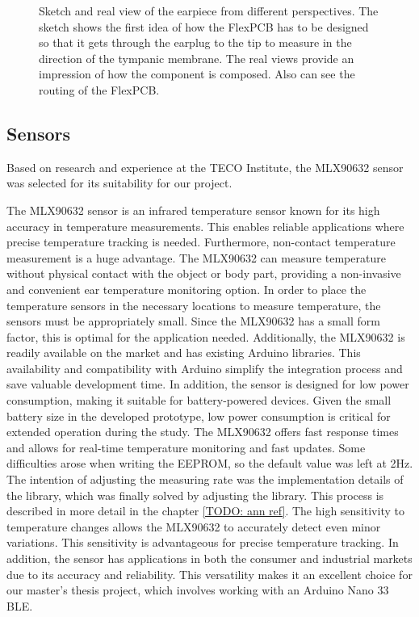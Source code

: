 \begin{figure}[!h]
    \caption{Sketch and real view of the earpiece from different perspectives.
The sketch shows the first idea of how the FlexPCB has to be designed so that it gets through the earplug to the tip to measure in the direction of the tympanic membrane. The real views provide an impression of how the component is composed. Also can see the routing of the FlexPCB.}
    \label{fig:design:prototype_earpiece_views}
\end{figure}

\subsection{Sensors}
\label{ch:Design:Prototype:Sensors}

Based on research and experience at the TECO Institute, the MLX90632 sensor was selected for its suitability for our project.

The MLX90632 sensor is an infrared temperature sensor known for its high accuracy in temperature measurements. This enables reliable applications where precise temperature tracking is needed.
Furthermore, non-contact temperature measurement is a huge advantage. The MLX90632 can measure temperature without physical contact with the object or body part, providing a non-invasive and convenient ear temperature monitoring option.
In order to place the temperature sensors in the necessary locations to measure temperature, the sensors must be appropriately small. Since the MLX90632 has a small form factor, this is optimal for the application needed.
Additionally, the MLX90632 is readily available on the market and has existing Arduino libraries. This availability and compatibility with Arduino simplify the integration process and save valuable development time.
In addition, the sensor is designed for low power consumption, making it suitable for battery-powered devices. Given the small battery size in the developed prototype, low power consumption is critical for extended operation during the study.
The MLX90632 offers fast response times and allows for real-time temperature monitoring and fast updates. Some difficulties arose when writing the EEPROM, so the default value was left at 2Hz.
The intention of adjusting the measuring rate was the implementation details of the library, which was finally solved by adjusting the library. This process is described in more detail in the chapter \ref{TODO: ann ref}.
The high sensitivity to temperature changes allows the MLX90632 to accurately detect even minor variations. This sensitivity is advantageous for precise temperature tracking.
In addition, the sensor has applications in both the consumer and industrial markets due to its accuracy and reliability. This versatility makes it an excellent choice for our master's thesis project, which involves working with an Arduino Nano 33 BLE.

